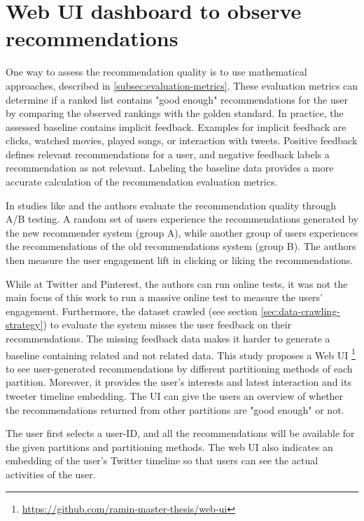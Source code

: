 \section{Web UI dashboard to observe recommendations}
\label{sec:web-ui}
One way to assess the recommendation quality is to use mathematical approaches, described in \ref{subsec:evaluation-metrics}. These evaluation metrics can determine if a ranked list contains "good enough" recommendations for the user by comparing the observed rankings with the golden standard. In practice, the assessed baseline contains implicit feedback. Examples for implicit feedback are clicks, watched movies, played songs, or interaction with tweets. Positive feedback defines relevant recommendations for a user, and negative feedback labels a recommendation as not relevant. Labeling the baseline data provides a more accurate calculation of the recommendation evaluation metrics.


In studies like \cite{eksombatchaiPixieSystemRecommending2018} and \cite{goelWhoToFollowSystemTwitter2015} the authors evaluate the recommendation quality through A/B testing. A random set of users experience the recommendations generated by the new recommender system (group A), while another group of users experiences the recommendations of the old recommendations system (group B). The authors then measure the user engagement lift in clicking or liking the recommendations. 


While at Twitter and Pinterest, the authors can run online tests, it was not the main focus of this work to run a massive online test to measure the users' engagement. Furthermore, the dataset crawled (see section \ref{sec:data-crawling-strategy}) to evaluate the system misses the user feedback on their recommendations. The missing feedback data makes it harder to generate a baseline containing related and not related data. This study proposes a Web UI \footnote{\url{https://github.com/ramin-master-thesis/web-ui}} to see user-generated recommendations by different partitioning methods of each partition. Moreover, it provides the user's interests and latest interaction and its tweeter timeline embedding. The UI can give the users an overview of whether the recommendations returned from other partitions are "good enough" or not.


The user first selects a user-ID, and all the recommendations will be available for the given partitions and partitioning methods. The web UI also indicates an embedding of the user's Twitter timeline so that users can see the actual activities of the user. 


